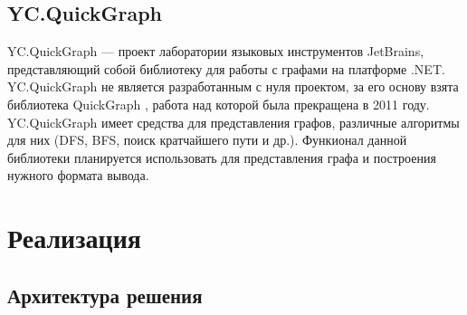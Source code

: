 \documentclass[14pt]{matmex-diploma-custom}
\begin{document}
	\subsection{YC.QuickGraph}
	    YC.QuickGraph --- проект лаборатории языковых инструментов JetBrains, представляющий собой библиотеку для работы с графами на платформе .NET. YC.QuickGraph не является разработанным с нуля проектом, за его основу взята библиотека QuickGraph \cite{quickgraph}, работа над которой была прекращена в 2011 году. YC.QuickGraph имеет средства для представления графов, различные алгоритмы для них (DFS, BFS, поиск кратчайшего пути и др.). Функионал данной библиотеки планируется использовать для представления графа и построения нужного формата вывода.
\section{Реализация}

    \subsection{Архитектура решения}
    
\end{document}
